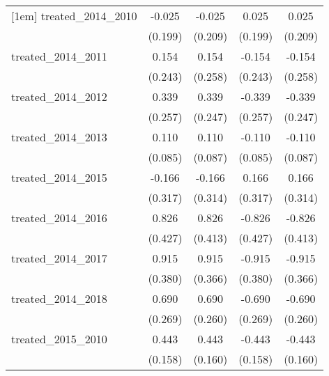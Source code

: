 {\begin{tabular}{l*{4}{c}}
[1em]
treated\_2014\_2010&      -0.025         &      -0.025         &       0.025         &       0.025         \\
            &     (0.199)         &     (0.209)         &     (0.199)         &     (0.209)         \\
[1em]
treated\_2014\_2011&       0.154         &       0.154         &      -0.154         &      -0.154         \\
            &     (0.243)         &     (0.258)         &     (0.243)         &     (0.258)         \\
[1em]
treated\_2014\_2012&       0.339         &       0.339         &      -0.339         &      -0.339         \\
            &     (0.257)         &     (0.247)         &     (0.257)         &     (0.247)         \\
[1em]
treated\_2014\_2013&       0.110         &       0.110         &      -0.110         &      -0.110         \\
            &     (0.085)         &     (0.087)         &     (0.085)         &     (0.087)         \\
[1em]
treated\_2014\_2015&      -0.166         &      -0.166         &       0.166         &       0.166         \\
            &     (0.317)         &     (0.314)         &     (0.317)         &     (0.314)         \\
[1em]
treated\_2014\_2016&       0.826         &       0.826\sym{*}  &      -0.826         &      -0.826\sym{*}  \\
            &     (0.427)         &     (0.413)         &     (0.427)         &     (0.413)         \\
[1em]
treated\_2014\_2017&       0.915\sym{*}  &       0.915\sym{*}  &      -0.915\sym{*}  &      -0.915\sym{*}  \\
            &     (0.380)         &     (0.366)         &     (0.380)         &     (0.366)         \\
[1em]
treated\_2014\_2018&       0.690\sym{*}  &       0.690\sym{**} &      -0.690\sym{*}  &      -0.690\sym{**} \\
            &     (0.269)         &     (0.260)         &     (0.269)         &     (0.260)         \\
[1em]
treated\_2015\_2010&       0.443\sym{**} &       0.443\sym{**} &      -0.443\sym{**} &      -0.443\sym{**} \\
            &     (0.158)         &     (0.160)         &     (0.158)         &     (0.160)         \\

\end{tabular}}
